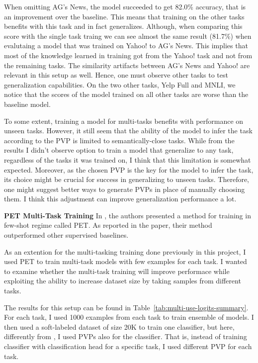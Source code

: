 \documentclass[11pt,a4paper]{article}
\begin{document}
When omitting AG's News, the model succeeded to get 82.0\% accuracy, that is an improvement over the baseline.
This means that training on the other tasks benefits with this task and in fact generalizes.
Although, when comparing this score with the single task traing we can see almost the same result (81.7\%) when evalutaing a model that was trained on Yahoo! to AG's News.
This implies that most of the knowledge learned in training got from the Yahoo! task and not from the remaining tasks.
The similarity artifacts between AG's News and Yahoo! are relevant in this setup as well.
Hence, one must observe other tasks to test generalization capabilities.
On the two other tasks, Yelp Full and MNLI, we notice that the scores of the model trained on all other tasks are worse than the baseline model.

To some extent, training a model for multi-tasks benefits with performance on unseen tasks.
However, it still seem that the ability of the model to infer the task according to the PVP is limited to semantically-close tasks.
While from the results I didn't observe option to train a model that generalize to any task, regardless of the tasks it was trained on, I think that this limitation is somewhat expected.
Moreover, as the chosen PVP is the key for the model to infer the task, its choice might be crucial for success in generalizing to unseen tasks.
Therefore, one might suggest better ways to generate PVPs in place of manually choosing them.
I think this adjustment can improve generalization performance a lot.


\vspace{8pt}

\noindent\textbf{PET Multi-Task Training}\quad
In \citet{schick2020exploiting}, the authors presented a method for training in few-shot regime called PET.
As reported in the paper, their method outperformed other supervised baselines.

As an extention for the multi-tasking training done previously in this project, I used PET to train multi-task models with few examples for each task.
I wanted to examine whether the multi-task training will improve performace while exploiting the ability to increase dataset size by taking samples from different tasks.

The results for this setup can be found in Table~\ref{tab:multi-use-logits-summary}.
For each task, I used 1000 examples from each task to train ensemble of models.
I then used a soft-labeled dataset of size 20K to train one classifier, but here, differently from \citet{schick2020exploiting}, I used PVPs also for the classifier.
That is, instead of training classifier with classification head for a specific task, I used different PVP for each task.
\end{document}
